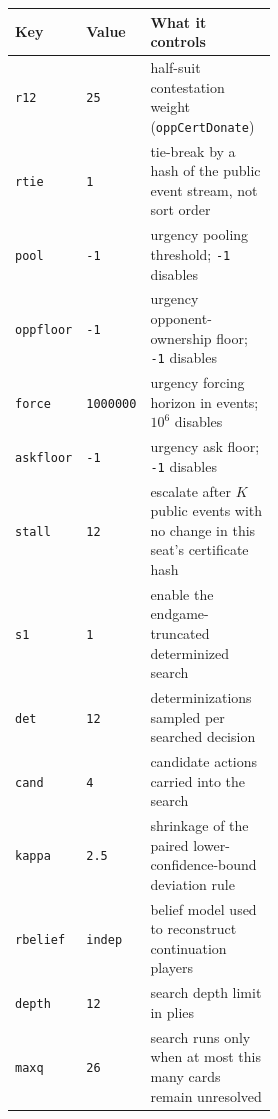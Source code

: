 \begin{tabular}{llp{0.52\linewidth}}
\toprule
Key & Value & What it controls \\
\midrule
\texttt{r12} & \texttt{25} & half-suit contestation weight (\texttt{oppCertDonate}) \\
\texttt{rtie} & \texttt{1} & tie-break by a hash of the public event stream, not sort order \\
\texttt{pool} & \texttt{-1} & urgency pooling threshold; \texttt{-1} disables \\
\texttt{oppfloor} & \texttt{-1} & urgency opponent-ownership floor; \texttt{-1} disables \\
\texttt{force} & \texttt{1000000} & urgency forcing horizon in events; $10^6$ disables \\
\texttt{askfloor} & \texttt{-1} & urgency ask floor; \texttt{-1} disables \\
\texttt{stall} & \texttt{12} & escalate after $K$ public events with no change in this seat's certificate hash \\
\texttt{s1} & \texttt{1} & enable the endgame-truncated determinized search \\
\texttt{det} & \texttt{12} & determinizations sampled per searched decision \\
\texttt{cand} & \texttt{4} & candidate actions carried into the search \\
\texttt{kappa} & \texttt{2.5} & shrinkage of the paired lower-confidence-bound deviation rule \\
\texttt{rbelief} & \texttt{indep} & belief model used to reconstruct continuation players \\
\texttt{depth} & \texttt{12} & search depth limit in plies \\
\texttt{maxq} & \texttt{26} & search runs only when at most this many cards remain unresolved \\
\bottomrule
\end{tabular}
